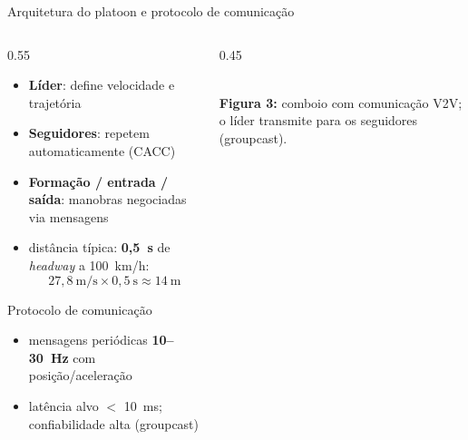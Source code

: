 \documentclass[aspectratio=169,11pt]{beamer}
\begin{document}
\begin{frame}{Arquitetura do platoon e protocolo de comunicação}
  \begin{columns}
    \begin{column}{0.55\textwidth}
      \begin{itemize}
        \item \textbf{Líder}: define velocidade e trajetória
        \item \textbf{Seguidores}: repetem automaticamente (CACC)
        \item \textbf{Formação / entrada / saída}: manobras negociadas via mensagens
        \item distância típica: \textbf{0,5~s} de \emph{headway} a 100~km/h:
          \[ 27{,}8~\text{m/s} \times 0{,}5~\text{s} \approx 14~\text{m} \]
      \end{itemize}
      \begin{block}{Protocolo de comunicação}
        \begin{itemize}
          \item mensagens periódicas \textbf{10--30~Hz} com posição/aceleração
          \item latência alvo $<$ 10~ms; confiabilidade alta (groupcast)
        \end{itemize}
      \end{block}
    \end{column}
    \begin{column}{0.45\textwidth}
      \begin{center}
        \\[1mm] {\scriptsize \textbf{Figura 3:} comboio com comunicação V2V; o líder transmite para os seguidores (groupcast).}
      \end{center}
    \end{column}
  \end{columns}
\end{frame}
\end{document}
